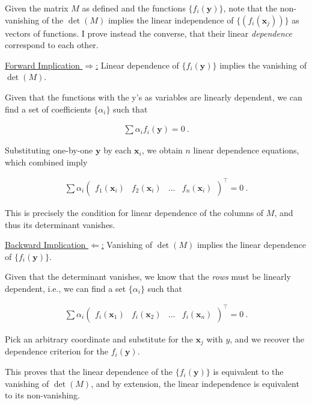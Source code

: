 \question

\newcommand{\xvar}{\mathbf{x}}
\newcommand{\yvar}{\mathbf{y}}

Given the matrix \(M\) as defined and the functions \(\{f_i(\yvar)\}\),
note that the non-vanishing of the \(\det(M)\) implies the linear independence
of \(\{(f_i(\xvar_j))\}\) as vectors of functions. I prove instead the converse,
that their linear \emph{dependence} correspond to each other.

\underline{Forward Implication \(\Rightarrow\):} Linear dependence of
\(\{f_i(\yvar)\}\) implies the vanishing of \(\det(M)\).

Given that the functions with the y's as variables are linearly dependent, we
can find a set of coefficients \(\{\alpha_i\}\) such that 

\begin{gather*}
    \sum \alpha_i f_i(\yvar) = 0~.
\end{gather*}

Substituting one-by-one \(\yvar\) by each \(\xvar_i\), we obtain \(n\) linear
dependence equations, which combined imply

\begin{gather*}
    \sum \alpha_i \begin{pmatrix}
        f_1(\xvar_i) & f_2(\xvar_i) & \ldots & f_n(\xvar_i)
    \end{pmatrix}^\top = 0~.
\end{gather*}

This is precisely the condition for linear dependence of the columns of \(M\),
and thus its determinant vanishes.

\underline{Backward Implication \(\Leftarrow\):} Vanishing of \(\det(M)\) implies
the linear dependence of \(\{f_i(\yvar)\}\).

Given that the determinant vanishes, we know that the \emph{rows} must be
linearly dependent, i.e., we can find a set \(\{\alpha_i\}\) such that

\begin{gather*}
    \sum \alpha_i \begin{pmatrix}
        f_i(\xvar_1) & f_i(\xvar_2) & \ldots & f_i(\xvar_n)
    \end{pmatrix}^\top = 0~.
\end{gather*}

Pick an arbitrary coordinate and substitute for the \(\xvar_j\) with \(y\), and
we recover the dependence criterion for the \(f_i(\yvar)\).

This proves that the linear dependence of the \(\{f_i(\yvar)\}\) is equivalent
to the vanishing of \(\det(M)\), and by extension, the linear independence is
equivalent to its non-vanishing.